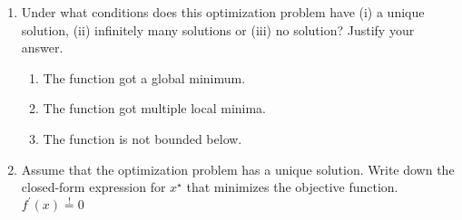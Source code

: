%

\begin{enumerate}[label=(\alph*)]
	\item Under what conditions does this optimization problem have (i) a unique solution, (ii) infinitely many solutions or (iii) no solution? Justify your answer.
	\begin{enumerate}[label=(\roman*)]
		\item The function got a global minimum.
		\item The function got multiple local minima.
		\item The function is not bounded below.
	\end{enumerate}

	\item Assume that the optimization problem has a unique solution. Write down the closed-form expression for $x^\star$ that minimizes the objective function.
		\subitem $f^{\prime}(x)\stackrel{!}{=}0$
\end{enumerate}
%
%
